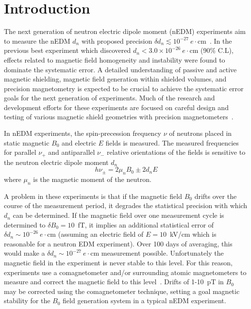 \documentclass[review]{elsarticle}
\begin{document}

\section{Introduction}

The next generation of neutron electric dipole moment (nEDM)
experiments aim to measure the nEDM $d_n$ with proposed precision
$\delta d_n\lesssim
10^{-27}~e\cdot$cm~\cite{bib:nedm2,bib:nedm2.5,bib:nedm3,bib:nedm3.5,bib:nedm5,bib:nedm6,bib:nedm6.5,bib:nedmtriumf}.
In the previous best experiment \cite{bib:baker,bib:pendlebury} which
discovered $d_n<3.0\times 10^{-26}~e\cdot$cm (90\% C.L), effects
related to magnetic field homogeneity and instability were found to
dominate the systematic error.  A detailed understanding of passive
and active magnetic shielding, magnetic field generation within
shielded volumes, and precision magnetometry is expected to be crucial
to achieve the systematic error goals for the next generation of
experiments.  Much of the research and development efforts for these
experiments are focused on careful design and testing of various
magnetic shield geometries with precision
magnetometers~\cite{bib:brys,bib:afach,bib:fierlingerroom,bib:sturmthesis,bib:patton}.

In nEDM experiments, the spin-precession frequency $\nu$ of neutrons
placed in static magnetic $B_0$ and electric $E$ fields is measured.
The measured frequencies for parallel $\nu_+$ and antiparallel $\nu_-$
relative orientations of the fields is sensitive to the neutron
electric dipole moment $d_n$
\begin{equation}
h\nu_\pm=2\mu_nB_0\pm 2d_nE
\end{equation}
where $\mu_n$ is the magnetic moment of the neutron.

A problem in these experiments is that if the magnetic field $B_0$
drifts over the course of the measurement period, it degrades the
statistical precision with which $d_n$ can be determined.  If the
magnetic field over one measurement cycle is determined to $\delta
B_0=10$~fT, it implies an additional statistical error of $\delta
d_n\sim 10^{-26}~e\cdot$cm (assuming an electric field of $E=10$~kV/cm
which is reasonable for a neutron EDM experiment).  Over 100 days of
averaging, this would make a $\delta d_n\sim 10^{-27}~e\cdot$cm
measurement possible.  Unfortunately the magnetic field in the
experiment is never stable to this level.  For this reason,
experiments use a comagnetometer and/or surrounding atomic
magnetometers to measure and correct the magnetic field to this
level~\cite{bib:baker,bib:brys,bib:afach}.  Drifts of 1-10~pT in $B_0$
may be corrected using the comagnetometer technique, setting a goal
magnetic stability for the $B_0$ field generation system in a typical
nEDM experiment.
\end{document}
